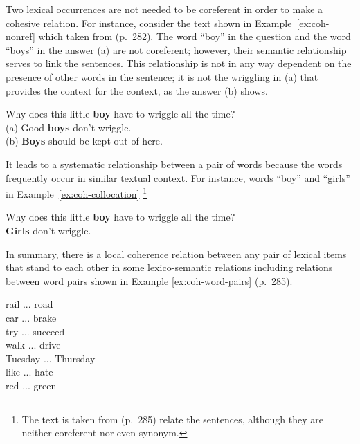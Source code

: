 Two lexical occurrences are not needed to be coreferent in order to make a cohesive relation.  
For instance, consider the text shown in Example~\ref{ex:coh-nonref} which taken from (p.~282). 
The word ``boy'' in the question and the word ``boys'' in the answer (a) are not coreferent; however, their semantic relationship serves to link the sentences. 
This relationship is not in any way dependent on the presence of other words in the sentence; it is not the wriggling in (a) that provides the context for the context, as the answer (b) shows. 

\begin{examples}
	\label{ex:coh-nonref}
	Why does this little \textbf{boy} have to wriggle all the time? \\
	(a) Good \textbf{boys} don't wriggle. \\
	(b) \textbf{Boys} should be kept out of here. \\
\end{examples} 

It leads to a systematic relationship between a pair of words because the words frequently occur in similar textual context. 
For instance, words ``boy'' and ``girls'' in Example~\ref{ex:coh-collocation}
\footnote{The text is taken from \cite{halliday76}(p.~285) relate the sentences, although they are neither coreferent nor even synonym.} 

\begin{examples}
	\label{ex:coh-collocation}
	Why does this little \textbf{boy} have to wriggle all the time? \\
	\textbf{Girls} don't wriggle. 
\end{examples}

In summary, there is a local coherence relation between any pair of lexical items that stand to each other in some lexico-semantic relations including relations between word pairs shown in Example \ref{ex:coh-word-pairs} \cite{halliday76} (p.~285). 

\begin{examples}
	\label{ex:coh-word-pairs}
	rail ... road \\
	car ... brake \\
	try ... succeed \\
	walk ... drive \\
	Tuesday ... Thursday \\
	like ... hate \\
	red ... green 
\end{examples}

